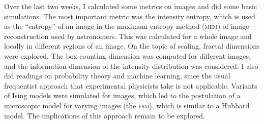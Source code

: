 \documentclass[../notebook.tex]{subfiles}
\begin{document}
\label{sec:sum1}

Over the last two weeks, I calculated some metrics on images and did some basic
simulations. The most important metric was the intensity entropy, which is used
as the ``entropy'' of an image in the maximum entropy method (\textsc{mem}) of
image reconstruction used by astronomers. This was calculated for a whole image
and locally in different regions of an image. On the topic of scaling, fractal
dimensions were explored. The box-counting dimension was computed for different
images, and the information dimension of the intensity distribution was
considered. I also did readings on probability theory and machine learning,
since the usual frequentist approach that experimental physicists take is not
applicable. Variants of Ising models were simulated for images, which led to the
postulation of a microscopic model for varying images (the \textsc{fsm}), which
is similar to a Hubbard model. The implications of this approach remain to be
explored.
\end{document}
